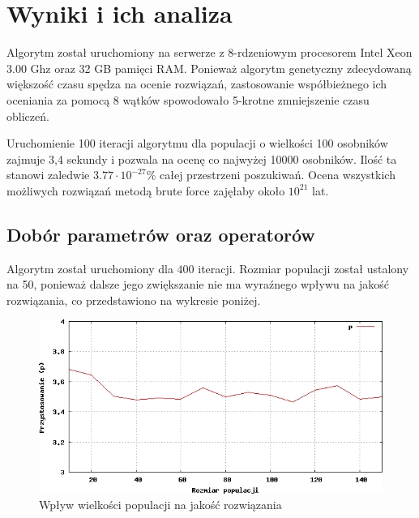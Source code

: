 \documentclass{xmgr}
\begin{document}
\chapter{Wyniki i ich analiza}

Algorytm został uruchomiony na serwerze z 8-rdzeniowym procesorem Intel Xeon 3.00 Ghz oraz 32 GB pamięci RAM. Ponieważ algorytm genetyczny zdecydowaną większość czasu spędza na ocenie rozwiązań, zastosowanie współbieżnego ich oceniania za pomocą 8 wątków spowodowało 5-krotne zmniejszenie czasu obliczeń.

Uruchomienie 100 iteracji algorytmu dla populacji o wielkości 100 osobników zajmuje 3,4 sekundy i pozwala na ocenę co najwyżej 10000 osobników. Ilość ta stanowi zaledwie $ 3.77 \cdot 10^{-27} \% $ całej przestrzeni poszukiwań. Ocena wszystkich możliwych rozwiązań metodą brute force zajęłaby około $ 10^{21} $ lat.

\section{Dobór parametrów oraz operatorów}

Algorytm został uruchomiony dla $400$ iteracji. Rozmiar populacji został ustalony na 50, ponieważ dalsze jego zwiększanie nie ma wyraźnego wpływu na jakość rozwiązania, co przedstawiono na wykresie poniżej.
\begin{figure}[!tbh]
\centering
\includegraphics[width=.8\hsize]{fig/population_size}
\caption{Wpływ wielkości populacji na jakość rozwiązania}
\end{figure}
\end{document}
